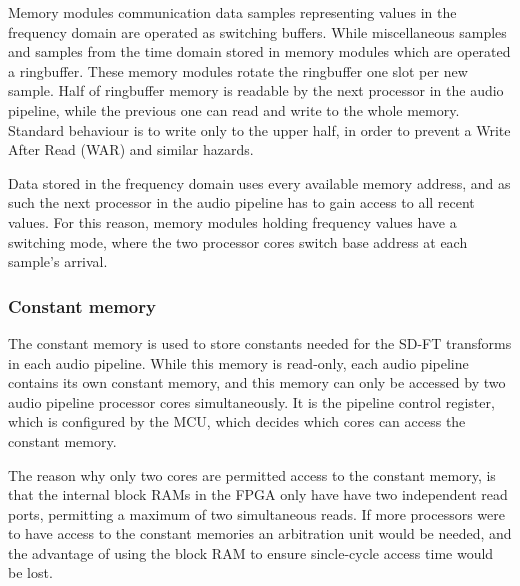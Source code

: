 Memory modules communication data samples representing values in the frequency
domain are operated as switching buffers. While miscellaneous samples and
samples from the time domain stored in memory modules which are operated a
ringbuffer. These memory modules rotate the ringbuffer one slot per new sample.
Half of ringbuffer memory is readable by the next processor in the audio
pipeline, while the previous one can read and write to the whole memory.
Standard behaviour is to write only to the upper half, in order to prevent a
Write After Read (WAR) and similar hazards.

Data stored in the frequency domain uses every available memory address, and as
such the next processor in the audio pipeline has to gain access to all recent
values. For this reason, memory modules holding frequency values have a
switching mode, where the two processor cores switch base address at each
sample's arrival.

\subsubsection{Constant memory}
The constant memory is used to store constants needed for the SD-FT transforms
in each audio pipeline. While this memory is read-only, each audio pipeline
contains its own constant memory, and this memory can only be accessed by two
audio pipeline processor cores simultaneously. It is the pipeline control
register, which is configured by the MCU, which decides which cores can access
the constant memory.

The reason why only two cores are permitted access to the constant memory, is
that the internal block RAMs in the FPGA only have have two independent
read ports, permitting a maximum of two simultaneous reads. If more processors
were to have access to the constant memories an arbitration unit would be
needed, and the advantage of using the block RAM to ensure sincle-cycle access
time would be lost.
